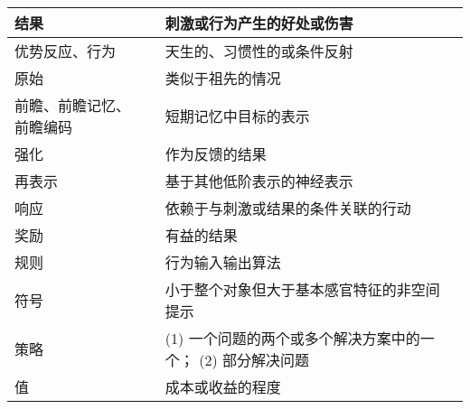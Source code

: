 \begin{table}[htbp]
{\begin{tabular}{llll}
			\midrule
			结果      &&刺激或行为产生的好处或伤害   \\
			\midrule
			优势反应、行为      &&天生的、习惯性的或条件反射   \\
			\midrule
			原始     &&类似于祖先的情况   \\
			\midrule
			前瞻、前瞻记忆、前瞻编码       &&短期记忆中目标的表示   \\
			\midrule
			强化       &&作为反馈的结果   \\
			\midrule
			再表示       &&基于其他低阶表示的神经表示   \\
			\midrule
			响应       &&依赖于与刺激或结果的条件关联的行动   \\
			\midrule
			奖励       &&有益的结果   \\
			\midrule
			规则      &&行为输入输出算法   \\
			\midrule
			符号      &&小于整个对象但大于基本感官特征的非空间提示   \\
			\midrule
			策略      &&(1) 一个问题的两个或多个解决方案中的一个； (2) 部分解决问题   \\
			\midrule
			值      &&成本或收益的程度   \\
			\bottomrule  
			
	\end{tabular}}
\end{table}%

